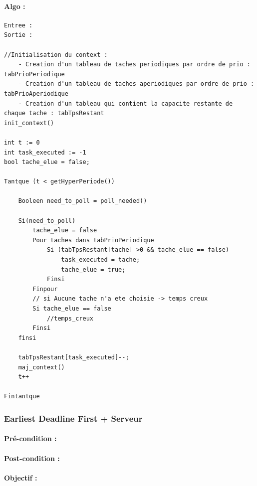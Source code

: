 				\paragraph{Algo :} 
					\begin{lstlisting}
Entree : 
Sortie :  

//Initialisation du context : 
	- Creation d'un tableau de taches periodiques par ordre de prio : tabPrioPeriodique
	- Creation d'un tableau de taches aperiodiques par ordre de prio : tabPrioAperiodique
	- Creation d'un tableau qui contient la capacite restante de chaque tache : tabTpsRestant
init_context()

int t := 0
int task_executed := -1
bool tache_elue = false;

Tantque (t < getHyperPeriode())
	
    Booleen need_to_poll = poll_needed()
	
    Si(need_to_poll)
        tache_elue = false
        Pour taches dans tabPrioPeriodique
        	Si (tabTpsRestant[tache] >0 && tache_elue == false)
        		task_executed = tache;
        		tache_elue = true;
        	Finsi 
        Finpour
        // si Aucune tache n'a ete choisie -> temps creux
        Si tache_elue == false
        	//temps_creux
        Finsi
    finsi
	
	tabTpsRestant[task_executed]--;
    maj_context()
    t++
	
Fintantque
					\end{lstlisting}
					
					
			\subsubsection{Earliest Deadline First + Serveur}
			
				\paragraph{Pré-condition :} 
				\paragraph{Post-condition :} 
				\paragraph{Objectif :} 
